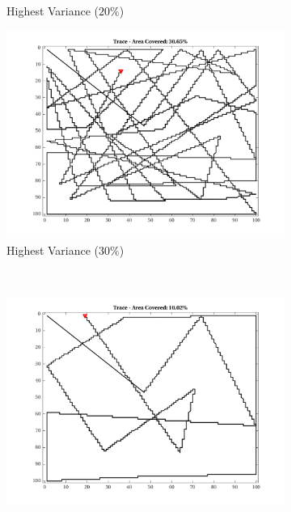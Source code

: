 \begin{figure}[htb!]
\begin{subfigure}[t]{0.32\textwidth}
        \caption{Highest Variance ($20\%$)}
    \end{subfigure}%
    \begin{subfigure}[t]{0.32\textwidth}
        \centering
        \includegraphics[width=\linewidth]{figures/hbresults/path_nhv_30p_100x100_sf_100_seed_2.png}
        \ssp
        \captionsetup{skip=0.20\baselineskip,size=footnotesize}
        \caption{Highest Variance ($30\%$)}
    \end{subfigure}%
    \\
    \begin{subfigure}[t]{0.32\textwidth}
        \centering
        \includegraphics[width=\linewidth]{figures/hbresults/path_nnhv_10p_100x100_sf_100_seed_2.png}
        \ssp

\end{subfigure}
\end{figure}
